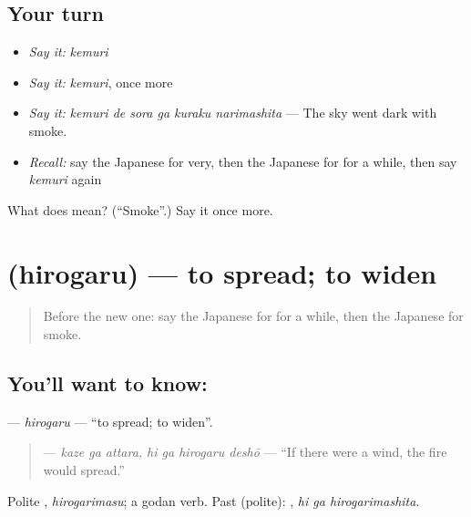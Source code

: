 \subsection*{Your turn}
\begin{itemize}
\raggedright
  \item \emph{Say it:} \emph{kemuri}
  \item \emph{Say it:} \emph{kemuri}, once more
  \item \emph{Say it:} \emph{kemuri de sora ga kuraku narimashita} — The sky went dark with smoke.
  \item \emph{Recall:} say the Japanese for very, then the Japanese for for a while, then say \emph{kemuri} again
\end{itemize}

\begin{tcolorbox}[breakable,colback=teal!4,colframe=teal!35!black,title={Before you move on}]
What does  mean? (\textquotedblleft{}Smoke\textquotedblright{}.) Say it once more.
\end{tcolorbox}
\section[\texorpdfstring{\ja{ひろがる} (hirogaru)}{ひろがる (hirogaru)}]{ (hirogaru) — to spread; to widen}

\label{lesson:JA-C265-hirogaru}



\begin{quote}
Before the new one: say the Japanese for for a while, then the Japanese for smoke.
\end{quote}

\subsection*{You'll want to know: }
\textbf{} — \emph{hirogaru} — \textquotedblleft{}to spread; to widen\textquotedblright{}.

\begin{quote}
\textbf{  } — \emph{kaze ga attara, hi ga hirogaru deshō} — \textquotedblleft{}If there were a wind, the fire would spread.\textquotedblright{}
\end{quote}

Polite \textbf{}, \emph{hirogarimasu}; a godan verb. Past (polite): \textbf{ }, \emph{hi ga hirogarimashita}.

